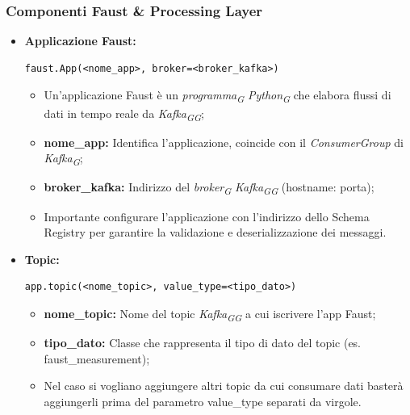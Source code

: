 \subsubsection{Componenti Faust \& Processing Layer}
\begin{itemize}
    \item \textbf{Applicazione Faust:}
    \begin{lstlisting}[style=code]
    faust.App(<nome_app>, broker=<broker_kafka>)
    \end{lstlisting} 
    \begin{itemize}
        \item Un'applicazione Faust è un \textit{programma}\textsubscript{\textit{G}} \textit{Python}\textsubscript{\textit{G}} che elabora flussi di dati in tempo reale da \textit{Kafka}\textsubscript{\textit{G}}\textsubscript{\textit{G}};
        \item \textbf{nome\_app:} Identifica l'applicazione, coincide con il \textit{ConsumerGroup} di \textit{Kafka}\textsubscript{\textit{G}};
        \item \textbf{broker\_kafka:} Indirizzo del \textit{broker}\textsubscript{\textit{G}} \textit{Kafka}\textsubscript{\textit{G}}\textsubscript{\textit{G}} (hostname: porta);
        \item Importante configurare l'applicazione con l'indirizzo dello Schema Registry per garantire la validazione e deserializzazione dei messaggi.
    \end{itemize}

    \item \textbf{Topic:}
    \begin{lstlisting}[style=code]
    app.topic(<nome_topic>, value_type=<tipo_dato>)
    \end{lstlisting}  
    \begin{itemize}
        \item \textbf{nome\_topic:} Nome del topic \textit{Kafka}\textsubscript{\textit{G}}\textsubscript{\textit{G}} a cui iscrivere l'app Faust;
        \item \textbf{tipo\_dato:} Classe che rappresenta il tipo di dato del topic (es. faust\_measurement);
        \item Nel caso si vogliano aggiungere altri topic da cui consumare dati basterà aggiungerli prima del parametro value\_type separati da virgole.
    \end{itemize}


\end{itemize}
